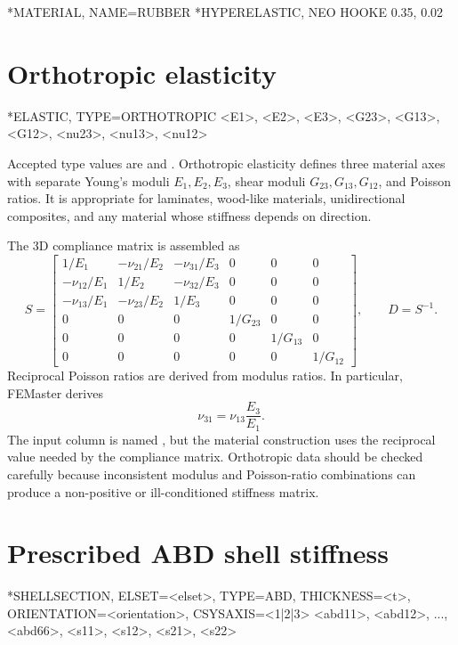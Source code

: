 \begin{exampledeck}
*MATERIAL, NAME=RUBBER
*HYPERELASTIC, NEO HOOKE
0.35, 0.02
\end{exampledeck}

\section{Orthotropic elasticity}

\begin{syntax}
*ELASTIC, TYPE=ORTHOTROPIC
<E1>, <E2>, <E3>, <G23>, <G13>, <G12>, <nu23>, <nu13>, <nu12>
\end{syntax}

Accepted type values are  and . Orthotropic elasticity defines three material axes with separate Young's moduli \(E_1,E_2,E_3\), shear moduli \(G_{23},G_{13},G_{12}\), and Poisson ratios. It is appropriate for laminates, wood-like materials, unidirectional composites, and any material whose stiffness depends on direction.

The 3D compliance matrix is assembled as
\[
S =
\begin{bmatrix}
1/E_1 & -\nu_{21}/E_2 & -\nu_{31}/E_3 & 0 & 0 & 0\\
-\nu_{12}/E_1 & 1/E_2 & -\nu_{32}/E_3 & 0 & 0 & 0\\
-\nu_{13}/E_1 & -\nu_{23}/E_2 & 1/E_3 & 0 & 0 & 0\\
0 & 0 & 0 & 1/G_{23} & 0 & 0\\
0 & 0 & 0 & 0 & 1/G_{13} & 0\\
0 & 0 & 0 & 0 & 0 & 1/G_{12}
\end{bmatrix},
\qquad
D = S^{-1}.
\]
Reciprocal Poisson ratios are derived from modulus ratios. In particular, FEMaster derives
\[
\nu_{31} = \nu_{13}\frac{E_3}{E_1}.
\]
The input column is named , but the material construction uses the reciprocal value needed by the compliance matrix. Orthotropic data should be checked carefully because inconsistent modulus and Poisson-ratio combinations can produce a non-positive or ill-conditioned stiffness matrix.

\section{Prescribed ABD shell stiffness}

\begin{syntax}
*SHELLSECTION, ELSET=<elset>, TYPE=ABD, THICKNESS=<t>, ORIENTATION=<orientation>, CSYSAXIS=<1|2|3>
<abd11>, <abd12>, ..., <abd66>,
<s11>, <s12>, <s21>, <s22>
\end{syntax}

